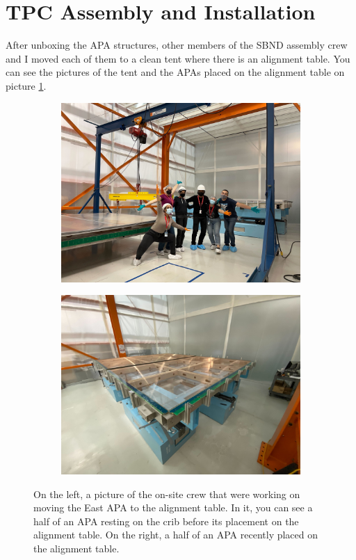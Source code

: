 \section{TPC Assembly and Installation}

After unboxing the APA structures, other members of the SBND assembly crew and I moved each of them to a clean tent where there is an alignment table. You can see the pictures of the tent and the APAs placed on the alignment table on picture \ref{fig:eastAPA}.

\begin{figure}[ht!]
    \centering
    \begin{subfigure}[t]{0.5\textwidth}
        \includegraphics[width=\textwidth]{Figures/eastAPA_post.jpg}
        \caption{}
    \end{subfigure}
    \hfill
    \begin{subfigure}[t]{0.49\textwidth}
        \includegraphics[width=\textwidth]{Figures/east_APA_pre.jpg}
        \caption{}
    \end{subfigure}
    \caption{On the left, a picture of the on-site crew that were working on moving the East APA to the alignment table. In it, you can see a half of an APA resting on the crib before its placement on the alignment table. On the right, a half of an APA recently placed on the alignment table.}
    \label{fig:eastAPA}
\end{figure}

